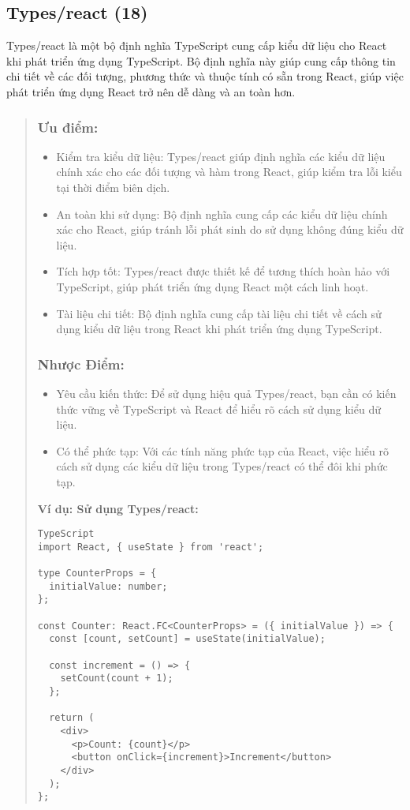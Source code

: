 \subsection{Types/react (18)}

Types/react là một bộ định nghĩa TypeScript cung cấp kiểu dữ liệu cho React khi phát triển ứng dụng TypeScript. Bộ định nghĩa này giúp cung cấp thông tin chi tiết về các đối tượng, phương thức và thuộc tính có sẵn trong React, giúp việc phát triển ứng dụng React trở nên dễ dàng và an toàn hơn.

\begin{quote}
\subsubsection{Ưu điểm:}
\begin{itemize}
  \item Kiểm tra kiểu dữ liệu: Types/react giúp định nghĩa các kiểu dữ liệu chính xác cho các đối tượng và hàm trong React, giúp kiểm tra lỗi kiểu tại thời điểm biên dịch.
  \item An toàn khi sử dụng: Bộ định nghĩa cung cấp các kiểu dữ liệu chính xác cho React, giúp tránh lỗi phát sinh do sử dụng không đúng kiểu dữ liệu.
  \item Tích hợp tốt: Types/react được thiết kế để tương thích hoàn hảo với TypeScript, giúp phát triển ứng dụng React một cách linh hoạt.
  \item Tài liệu chi tiết: Bộ định nghĩa cung cấp tài liệu chi tiết về cách sử dụng kiểu dữ liệu trong React khi phát triển ứng dụng TypeScript.
\end{itemize}

\subsubsection{Nhược Điểm:}
\begin{itemize}
  \item Yêu cầu kiến thức: Để sử dụng hiệu quả Types/react, bạn cần có kiến thức vững về TypeScript và React để hiểu rõ cách sử dụng kiểu dữ liệu.
  \item Có thể phức tạp: Với các tính năng phức tạp của React, việc hiểu rõ cách sử dụng các kiểu dữ liệu trong Types/react có thể đôi khi phức tạp.
\end{itemize}

\textbf{Ví dụ: Sử dụng Types/react:}
\begin{lstlisting}
TypeScript
import React, { useState } from 'react';

type CounterProps = {
  initialValue: number;
};

const Counter: React.FC<CounterProps> = ({ initialValue }) => {
  const [count, setCount] = useState(initialValue);

  const increment = () => {
    setCount(count + 1);
  };

  return (
    <div>
      <p>Count: {count}</p>
      <button onClick={increment}>Increment</button>
    </div>
  );
};
\end{lstlisting}
\end{quote}



